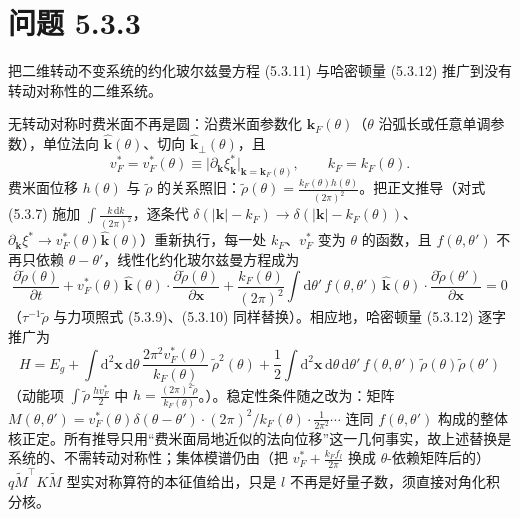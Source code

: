 \section*{问题 5.3.3}
\begin{problem}
把二维转动不变系统的约化玻尔兹曼方程 (5.3.11) 与哈密顿量 (5.3.12) 推广到没有转动对称性的二维系统。
\end{problem}
\solution

无转动对称时费米面不再是圆：沿费米面参数化 $\pmb{k}_F(\theta)$（$\theta$ 沿弧长或任意单调参数），单位法向 $\hat{\pmb{k}}(\theta)$、切向 $\hat{\pmb{k}}_{\perp}(\theta)$，且
\begin{equation*}
v_F^{*}=v_F^{*}(\theta)\equiv\big|\partial_{\pmb{k}}\xi^{*}_{\pmb{k}}\big|_{\pmb{k}=\pmb{k}_F(\theta)},\qquad
k_F=k_F(\theta).
\end{equation*}
费米面位移 $h(\theta)$ 与 $\tilde\rho$ 的关系照旧：$\tilde\rho(\theta)=\frac{k_F(\theta)h(\theta)}{(2\pi)^{2}}$。把正文推导（对式 (5.3.7) 施加 $\int\frac{k\,\mathrm{d}k}{(2\pi)^{2}}$，逐条代 $\delta(|\pmb{k}|-k_F)\to\delta(|\pmb{k}|-k_F(\theta))$、$\partial_{\pmb{k}}\xi^{*}\to v_F^{*}(\theta)\hat{\pmb{k}}(\theta)$）重新执行，每一处 $k_F$、$v_F^{*}$ 变为 $\theta$ 的函数，且 $f(\theta,\theta')$ 不再只依赖 $\theta-\theta'$，线性化约化玻尔兹曼方程成为
\begin{equation*}
\boxed{\;
\frac{\partial \tilde\rho(\theta)}{\partial t}
+v_F^{*}(\theta)\,\hat{\pmb{k}}(\theta)\cdot\frac{\partial \tilde\rho(\theta)}{\partial\pmb{x}}
+\frac{k_F(\theta)}{(2\pi)^{2}}\int\mathrm{d}\theta'\,f(\theta,\theta')\,
\hat{\pmb{k}}(\theta)\cdot\frac{\partial\tilde\rho(\theta')}{\partial\pmb{x}}
=0\;}
\end{equation*}
（$\tau^{-1}\tilde\rho$ 与力项照式 (5.3.9)、(5.3.10) 同样替换）。相应地，哈密顿量 (5.3.12) 逐字推广为
\begin{equation*}
\boxed{\;
H=E_g+\int\mathrm{d}^{2}\pmb{x}\,\mathrm{d}\theta\,
\frac{2\pi^{2}v_F^{*}(\theta)}{k_F(\theta)}\,\tilde\rho^{2}(\theta)
+\frac12\int\mathrm{d}^{2}\pmb{x}\,\mathrm{d}\theta\,\mathrm{d}\theta'\,
f(\theta,\theta')\,\tilde\rho(\theta)\tilde\rho(\theta')\;}
\end{equation*}
（动能项 $\int\tilde\rho\,\frac{hv_F^{*}}{2}$ 中 $h=\frac{(2\pi)^{2}\tilde\rho}{k_F(\theta)}$。）。稳定性条件随之改为：矩阵 $M(\theta,\theta')=v_F^{*}(\theta)\delta(\theta-\theta')\cdot(2\pi)^{2}/k_F(\theta)\cdot\frac{1}{2\pi^{2}}\cdots$ 连同 $f(\theta,\theta')$ 构成的整体核正定。所有推导只用“费米面局地近似的法向位移”这一几何事实，故上述替换是系统的、不需转动对称性；集体模谱仍由（把 $v_F^{*}+\frac{k_Ff_l}{2\pi}$ 换成 $\theta$-依赖矩阵后的）$q\tilde M^{\top}K\tilde M$ 型实对称算符的本征值给出，只是 $l$ 不再是好量子数，须直接对角化积分核。

